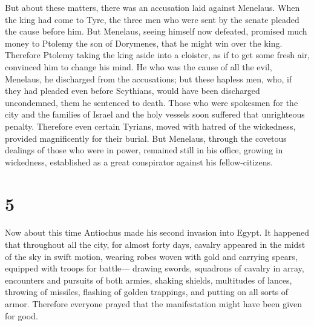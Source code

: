  But about these matters, there was an accusation laid
against Menelaus.  When the king had come to Tyre, the
three men who were sent by the senate pleaded the cause before him.
 But Menelaus, seeing himself now defeated, promised much
money to Ptolemy the son of Dorymenes, that he might win over the king.
 Therefore Ptolemy taking the king aside into a cloister,
as if to get some fresh air, convinced him to change his mind.
 He who was the cause of all the evil, Menelaus, he
discharged from the accusations; but these hapless men, who, if they had
pleaded even before Scythians, would have been discharged uncondemned,
them he sentenced to death.  Those who were spokesmen for
the city and the families of Israel and the holy vessels soon suffered
that unrighteous penalty.  Therefore even certain
Tyrians, moved with hatred of the wickedness, provided magnificently for
their burial.  But Menelaus, through the covetous
dealings of those who were in power, remained still in his office,
growing in wickedness, established as a great conspirator against his
fellow-citizens.

\hypertarget{section-4}{%
\section{5}\label{section-4}}

 Now about this time Antiochus made his second invasion
into Egypt.  It happened that throughout all the city, for
almost forty days, cavalry appeared in the midst of the sky in swift
motion, wearing robes woven with gold and carrying spears, equipped with
troops for battle---  drawing swords, squadrons of cavalry
in array, encounters and pursuits of both armies, shaking shields,
multitudes of lances, throwing of missiles, flashing of golden
trappings, and putting on all sorts of armor.  Therefore
everyone prayed that the manifestation might have been given for good.

